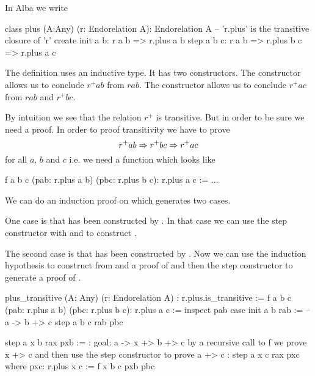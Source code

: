 In Alba we write

\begin{alba}
    class
        plus (A:Any) (r: Endorelation A): Endorelation A
            -- 'r.plus' is the transitive closure of 'r'
    create
        init a b:
            r a b
            => r.plus a b
        step a b c:
            r a b
            => r.plus b c
            => r.plus a c
\end{alba}

The definition uses an inductive type. It has two constructors. The
 constructor allows us to conclude $r^+ a b$ from $r a b$.  The
 constructor allows us to conclude $r^+ a c$ from $r a b$ and $r^+
b c$.

By intuition we see that the relation $r^+$ is transitive. But in
order to be sure we need a proof. In order to proof transitivity we have to
prove
%
$$
 r^+ a b \Rightarrow r^+ b c \Rightarrow r^+ a c
$$
%
for all $a$, $b$ and $c$
i.e. we need a function which looks like
%
\begin{alba}
  f a b c (pab: r.plus a b) (pbc: r.plus b c): r.plus a c :=
    ...
\end{alba}
%
We can do an induction proof on  which generates two
cases.

One case is that  has been constructed
by . In that case we can use the step constructor with
 and  to construct .

The second case is that   has been constructed by . Now we can use the induction
hypothesis to construct from  and  a proof of  and then the step constructor to generate a proof of .


\begin{alba}
    plus_transitive
        (A: Any) (r: Endorelation A)
        : r.plus.is_transitive
    :=
        f a b c (pab: r.plus a b) (pbc: r.plus b c): r.plus a c :=
            inspect
                pab
            case
                init a b rab :=
                    -- a -> b +> c
                    step a b c rab pbc

                step a x b rax pxb :=
                    {: goal: a -> x +> b +> c
                       by a recursive call to f we prove x +> c
                       and then use the step constructor to prove a +> c :}
                    step a x c rax pxc
                    where
                        pxc: r.plus x c := f x b c pxb pbc
\end{alba}



